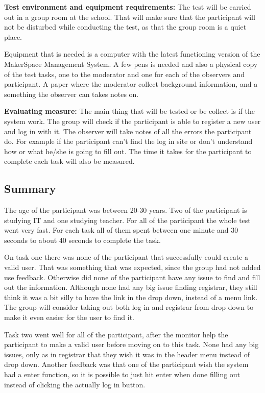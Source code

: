 \textbf{Test environment and equipment requirements:} The test will be carried out in a group room at the school. That will make sure that the participant will not be disturbed while conducting the test, as that the group room is a quiet place.  

Equipment that is needed is a computer with the latest functioning version of the MakerSpace Management System. A few pens is needed and also a physical copy of the test tasks, one to the moderator and one for each of the observers and participant. A paper where the moderator collect background information, and a something the observer can takes notes on.

\textbf{Evaluating measure:} The main thing that will be tested or be collect is if the system work. The group will check if the participant is able to register a new user and log in with it. The observer will take notes of all the errors the participant do. For example if the participant can't find the log in site or don't understand how or what he/she is going to fill out. The time it takes for the participant to complete each task will also be measured.

\subsection{Summary}
The age of the participant was between 20-30 years. Two of the participant is studying IT and one studying teacher. For all of the participant the whole test went very fast. For each task all of them spent between one minute and 30 seconds to about 40 seconds to complete the task. 

On task one there was none of the participant that successfully could create a valid user. That was something that was expected, since the group had not added use feedback. Otherwise did none of the participant have any issue to find and fill out the information. Although none had any big issue finding registrar, they still think it was a bit silly to have the link in the drop down, instead of a menu link. The group will consider taking out both log in and registrar from drop down to make it even easier for the user to find it.

Task two went well for all of the participant, after the monitor help the participant to make a valid user before moving on to this task. None had any big issues, only as in registrar that they wish it was in the header menu instead of drop down. Another feedback was that one of the participant wish the system had a enter function, so it is possible to just hit enter when done filling out instead of clicking the actually log in button.

